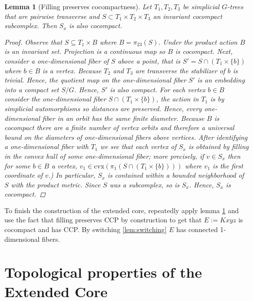\documentclass[12pt,parskip=full]{report}
\theoremstyle{plain}
\newtheorem{lem}[thm]{Lemma}
\theoremstyle{definition}
\begin{document}
\begin{lem} 
[Filling preserves cocompactness]
\label{lem:fillingcocompact}
    Let $T_1,T_2,T_3$ be simplicial $G$-trees that are pairwise transverse and $S\subset T_1\times T_2\times T_3$ an invariant cocompact subcomplex. Then $S_x$ is also cocompact.
\begin{proof}
    Observe that $S\subseteq T_1\times B$ where $B=\pi_{23}(S)$. Under the product action $B$ is an invariant set. Projection is a continuous map so $B$ is cocompact. Next, consider a one-dimensional fiber of $S$ above a point, that is $S' = S\cap (T_1\times \{b\})$ where $b\in B$ is a vertex. Because $T_2$ and $T_3$ are transverse the stabilizer of $b$ is trivial. Hence, the quotient map on the one-dimensional fiber $S'$ is an embedding into a compact set $S/G$. Hence, $S'$ is also compact. For each vertex $b\in B$ consider the one-dimensional fiber $S\cap (T_1\times \{b\})$, the action in $T_1$ is by simplicial automorphisms so distances are preserved. Hence, every one-dimensional fiber in an orbit has the same finite diameter. Because $B$ is cocompact there are a finite number of vertex orbits and therefore a universal bound on the diameters of one-dimensional fibers above vertices. After identifying a one-dimensional fiber with $T_1$ we see that each vertex of $S_x$ is obtained by filling in the convex hull of some one-dimensional fiber; more precisely, if $v\in S_x$ then for some $b\in B$ a vertex, $v_1\in \text{cvx}(\pi_1(S\cap(T_1\times \{b\})))$ where $v_1$ is the first coordinate of $v$.) In particular, $S_x$ is contained within a bounded neighborhood of $S$ with the product metric. Since $S$ was a subcomplex, so is $S_x$. Hence, $S_x$ is cocompact.
\end{proof}
\end{lem}

To finish the construction of the extended core, repeatedly apply lemma \ref{lem:fillingcocompact} and use the fact that filling preserves CCP  by construction to get that \(E:= Kxyz\) is cocompact and has CCP. By switching \ref{lem:switching} \(E\) has connected 1-dimensional fibers. 

\section{Topological properties of the Extended Core}
\end{document}
